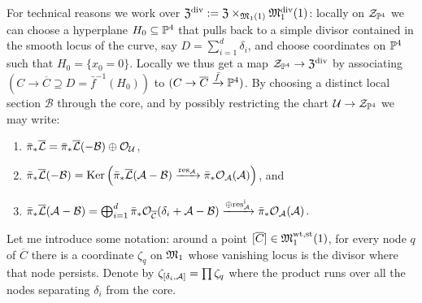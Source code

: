 For technical reasons we work over $\mathfrak Z^{\rm{div}}:=\mathfrak Z\times_{\mathfrak M_1(1)}\mathfrak M_1^{\textrm{div}}(1)$: locally on $\mathcal Z_{\mathbb P^4}$ we can choose a hyperplane $H_0\subseteq\mathbb P^4$ that pulls back to a simple divisor contained in the smooth locus of the curve, say $D=\sum_{i=1}^d \delta_i$, and choose coordinates on $\mathbb P^4$ such that $H_0=\{x_0=0\}$. Locally we thus get a map $\mathcal Z_{\mathbb P^4}\rightarrow \mathfrak Z^{\rm{div}}$ by associating $(C\to\overline{C}\supseteq D=\bar{f}^{-1}(H_0))$ to $(C\rightarrow \overline{C}\xrightarrow{\bar{f}}\mathbb P^4)$. By choosing a distinct local section $\mathcal B$ through the core, and by possibly restricting the chart $\mathcal U\rightarrow\mathcal Z_{\mathbb P^4}$ we may write:
\begin{enumerate}
 \item $\bar{\pi}_*\overline{\mathcal{L}}=\bar{\pi}_*\overline{\mathcal{L}}(-\mathcal B)\oplus\mathcal{O}_{\mathcal U}$,
 \item $\bar{\pi}_*\overline{\mathcal{L}}(-\mathcal B)=\operatorname{Ker}\left(\bar{\pi}_*\overline{\mathcal{L}}(\mathcal A-\mathcal B)\xrightarrow{\rm{res}_{\mathcal A}}\bar{\pi}_*\mathcal{O}_{\mathcal A}(\mathcal A)\right)$, and
 \item $\bar{\pi}_*\overline{\mathcal{L}}(\mathcal A-\mathcal B)=\bigoplus_{i=1}^d \bar{\pi}_*\mathcal{O}_{\overline{\mathcal C}}(\delta_i+\mathcal A-\mathcal B)\xrightarrow{\oplus \rm{res}^i_{\mathcal A}}\bar{\pi}_*\mathcal{O}_{\mathcal A}(\mathcal A)$.
\end{enumerate}

Let me introduce some notation: around a point $[\overline{C}]\in\mathfrak M_1^{\rm{wt,st}}(1)$, for every node $q$ of $\overline{C}$ there is a coordinate $\zeta_q$ on $\mathfrak M_1$ whose vanishing locus is the divisor where that node persists. Denote by $\zeta_{[\delta_i,\mathcal A]}=\prod\zeta_q$
where the product runs over all the nodes separating $\delta_i$ from the core.
 
